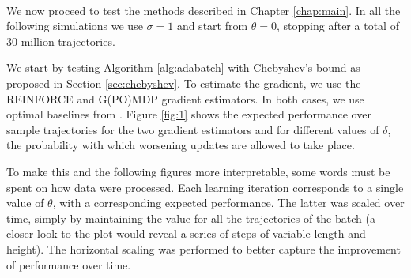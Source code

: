 \paragraph{}
We now proceed to test the methods described in Chapter \ref{chap:main}. 
In all the following simulations we use $\sigma = 1$ and start from $\theta=0$, stopping after a total of 30 million trajectories.

We start by testing Algorithm \ref{alg:adabatch} with Chebyshev's bound as proposed in Section \ref{sec:chebyshev}. To estimate the gradient, we use the REINFORCE and G(PO)MDP gradient estimators. In both cases, we use optimal baselines from \cite{4867}.
Figure \ref{fig:1} shows the expected performance over sample trajectories for the two gradient estimators and for different values of $\delta$, the probability with which worsening updates are allowed to take place.

 To make this and the following figures more interpretable, some words must be spent on how data were processed. Each learning iteration corresponds to a single value of $\theta$, with a corresponding expected performance. The latter was scaled over time, simply by maintaining the value for all the trajectories of the batch (a closer look to the plot would reveal a series of steps of variable length and height). The horizontal scaling was performed to better capture the improvement of performance over time.


